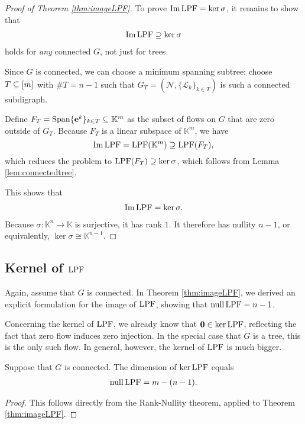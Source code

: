 \documentclass[main.tex]{subfiles}
\begin{document}
\begin{proof}[Proof of Theorem \ref{thm:imageLPF}]
To prove $\operatorname{Im} \text{\textup{LPF}} = \ker \sigma$, it remains to show that 
\begin{gather}
\operatorname{Im} \text{\textup{LPF}} \supseteq \ker \sigma
\end{gather}
holds for \emph{any} connected $G$, not just for trees.

Since $G$ is connected, we can choose a minimum spanning subtree: choose $T \subseteq [m]$ with $\# T = n-1$ such that $G_T=(\mathcal{N}, \{\mathcal{L}_k\}_{k \in T})$ is such a connected subdigraph.

Define $F_T = \operatorname{Span} \{\mathbf{e}^k\}_{k \in T} \subseteq \mathbb{K}^m$ as the subset of flows on $G$ that are zero outside of $G_T$. Because $F_T$ is a linear subspace of $\mathbb{K}^m$, we have
$$\operatorname{Im} \text{\textup{LPF}} = \text{\textup{LPF}} (\mathbb{K}^m) \supseteq \text{\textup{LPF}}(F_T),$$
which reduces the problem to $\text{\textup{LPF}}(F_T) \supseteq \ker \sigma$, which follows from Lemma \ref{lem:connectedtree}.

This shows that
\begin{gather*}
    \operatorname{Im} \text{\textup{LPF}} = \ker \sigma.
\end{gather*}
Because $\sigma : \mathbb{K}^n \rightarrow \mathbb{K}$ is surjective, it has rank $1$. It therefore has nullity $n-1$, or equivalently, $\ker \sigma \cong \mathbb{K}^{n-1}$. 
\end{proof}









\subsection{Kernel of $\text{\textup{LPF}}$}

Again, assume that $G$ is connected. In Theorem \ref{thm:imageLPF}, we derived an explicit formulation for the image of $\text{\textup{LPF}}$, showing that $\operatorname{null} \text{\textup{LPF}} = n-1$. 

Concerning the kernel of $\text{\textup{LPF}}$, we already know that $\mathbf{0} \in \ker \text{\textup{LPF}}$, reflecting the fact that zero flow induces zero injection. In the special case that $G$ is a tree, this is the only such flow. In general, however, the kernel of $\text{\textup{LPF}}$ is much bigger.

\begin{proposition}\label{prop:nullityLPF}
Suppose that $G$ is connected. The dimension of $\ker \text{\textup{LPF}}$ equals
\begin{gather*}
    \operatorname{null} \text{\textup{LPF}} = m - (n - 1).
\end{gather*}
\end{proposition}
\begin{proof}
This follows directly from the Rank-Nullity theorem, applied to Theorem \ref{thm:imageLPF}.
\end{proof}
\end{document}
